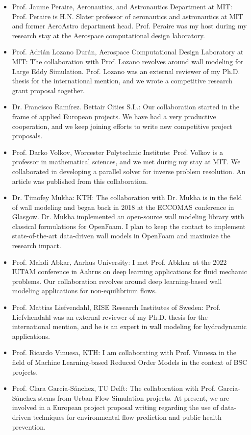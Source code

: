 \documentclass{article}
\begin{document}
\begin{itemize}
\item Prof. Jaume Peraire, Aeronautics, and Astronautics Department at MIT: Prof. Peraire is  H.N. Slater professor of aeronautics and astronautics at MIT and former AeroAstro department head. Prof. Peraire was my host during my research stay at the Aerospace computational design laboratory.
\item Prof. Adrián Lozano Durán, Aerospace Computational Design Laboratory at MIT: The collaboration with Prof. Lozano revolves around wall modeling for Large Eddy Simulation. Prof. Lozano was an external reviewer of my Ph.D. thesis for the international mention, and we wrote a competitive research grant proposal together.
\item Dr. Francisco Ramírez. Bettair Cities S.L.: Our collaboration started in the frame of applied European projects. We have had a very productive cooperation, and we keep joining efforts to write new competitive project proposals. 
\item Prof. Darko Volkov, Worcester Polytechnic Institute: Prof. Volkov is a professor in mathematical sciences, and we met during my stay at MIT. We collaborated in developing a parallel solver for inverse problem resolution. An article was published from this collaboration. 
\item Dr. Timofey Mukha: KTH: The collaboration with Dr. Mukha is in the field of wall modeling and began back in 2018 at the ECCOMAS conference in Glasgow. Dr. Mukha implemented an open-source wall modeling library with classical formulations for OpenFoam. I plan to keep the contact to implement state-of-the-art data-driven wall models in OpenFoam and maximize the research impact.
\item Prof. Mahdi Abkar, Aarhus University: I met Prof. Abkhar at the 2022 IUTAM conference in Aahrus on deep learning applications for fluid mechanic problems. Our collaboration revolves around deep learning-based wall modeling applications for non-equilibrium flows. 
\item Prof. Mattias Liefvendahl, RISE Research Institutes of Sweden: Prof. Liefvhendahl was an external reviewer of my Ph.D. thesis for the international mention, and he is an expert in wall modeling for hydrodynamic applications.  
\item Prof. Ricardo Vinuesa, KTH: I am collaborating with Prof. Vinuesa in the field of Machine Learning-based Reduced Order Models in the context of BSC projects. 
\item Prof. Clara Garcia-Sánchez, TU Delft: The collaboration with Prof. Garcia-Sánchez stems from Urban Flow Simulation projects. At present, we are involved in a European project proposal writing regarding the use of data-driven techniques for environmental flow prediction and public health prevention.

\end{itemize}
\end{document}
